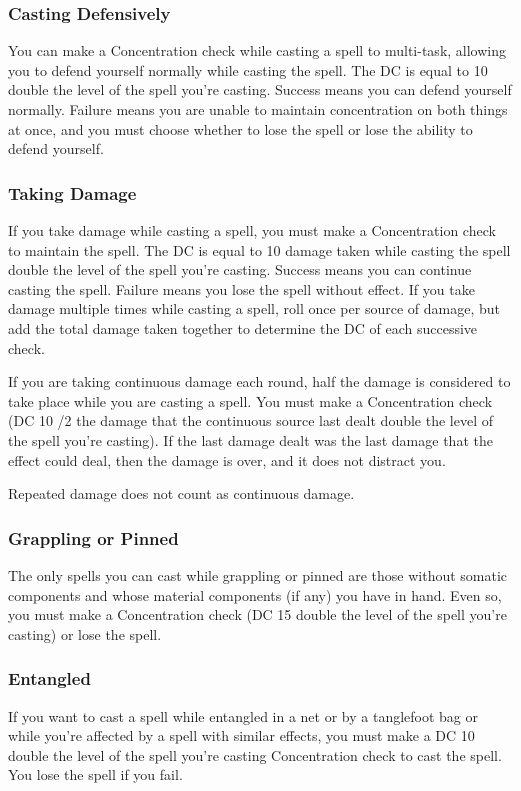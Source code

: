 \subsubsection{Casting Defensively}
You can make a Concentration check while casting a spell to multi-task, allowing you to defend yourself normally while casting the spell. The DC is equal to 10 \add double the level of the spell you're casting. Success means you can defend yourself normally. Failure means you are unable to maintain concentration on both things at once, and you must choose whether to lose the spell or lose the ability to defend yourself.

\subsubsection{Taking Damage}
If you take damage while casting a spell, you must make a Concentration check to maintain the spell. The DC is equal to 10 \add damage taken while casting the spell \add double the level of the spell you're casting. Success means you can continue casting the spell. Failure means you lose the spell without effect. If you take damage multiple times while casting a spell, roll once per source of damage, but add the total damage taken together to determine the DC of each successive check.

If you are taking continuous damage each round, half the damage is considered to take place while you are casting a spell. You must make a Concentration check (DC 10 /2 the damage that the continuous source last dealt \add double the level of the spell you're casting). If the last damage dealt was the last damage that the effect could deal, then the damage is over, and it does not distract you.

Repeated damage does not count as continuous damage.

\subsubsection{Grappling or Pinned}

The only spells you can cast while grappling or pinned are those without somatic components and whose material components (if any) you have in hand. Even so, you must make a Concentration check (DC 15 \add double the level of the spell you're casting) or lose the spell.

\subsubsection{Entangled}
If you want to cast a spell while entangled in a net or by a tanglefoot bag or while you're affected by a spell with similar effects, you must make a DC 10 \add double the level of the spell you're casting Concentration check to cast the spell. You lose the spell if you fail.

